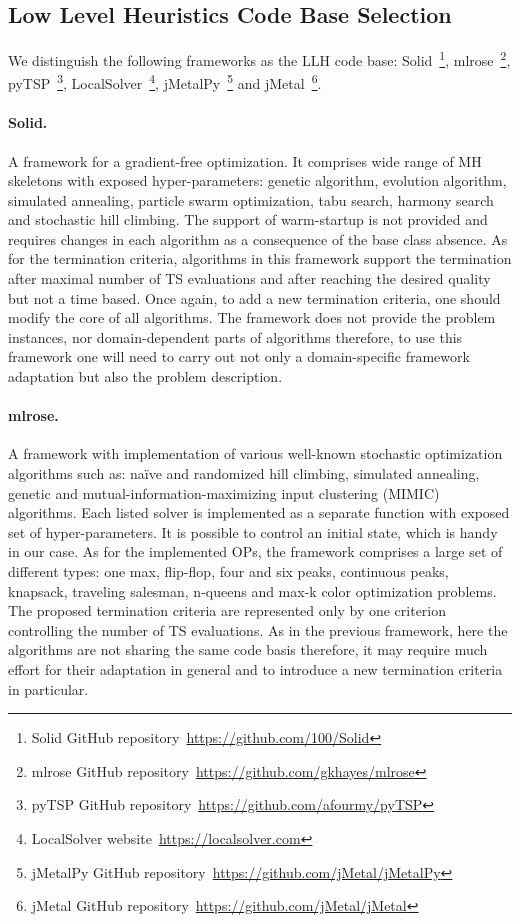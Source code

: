 \subsection{Low Level Heuristics Code Base Selection}\label{implementation:llh code basis selection}
We distinguish the following frameworks as the LLH code base: Solid~\footnote{Solid GitHub repository~\url{https://github.com/100/Solid}}, mlrose~\footnote{mlrose GitHub repository~\url{https://github.com/gkhayes/mlrose}}, pyTSP~\footnote{pyTSP GitHub repository~\url{https://github.com/afourmy/pyTSP}}, LocalSolver~\footnote{LocalSolver website~\url{https://localsolver.com}}, jMetalPy~\footnote{jMetalPy GitHub repository~\url{https://github.com/jMetal/jMetalPy}} and jMetal~\footnote{jMetal GitHub repository~\url{https://github.com/jMetal/jMetal}}.

\paragraph{Solid.} A framework for a gradient-free optimization. It comprises wide range of MH skeletons with exposed hyper-parameters: genetic algorithm, evolution algorithm, simulated annealing, particle swarm optimization, tabu search, harmony search and stochastic hill climbing. The support of warm-startup is not provided and requires changes in each algorithm as a consequence of the base class absence. As for the termination criteria, algorithms in this framework support the termination after maximal number of TS evaluations and after reaching the desired quality but not a time based. Once again, to add a new termination criteria, one should modify the core of all algorithms. The framework does not provide the problem instances, nor domain-dependent parts of algorithms therefore, to use this framework one will need to carry out not only a domain-specific framework adaptation but also the problem description.

\paragraph{mlrose.} A framework with implementation of various well-known stochastic optimization algorithms such as: na\"ive and randomized hill climbing, simulated annealing, genetic and mutual-information-maximizing input clustering (MIMIC) algorithms. Each listed solver is implemented as a separate function with exposed set of hyper-parameters. It is possible to control an initial state, which is handy in our case. As for the implemented OPs, the framework comprises a large set of different types: one max, flip-flop, four and six peaks, continuous peaks, knapsack, traveling salesman, n-queens and max-k color optimization problems. The proposed termination criteria are represented only by one criterion controlling the number of TS evaluations. As in the previous framework, here the algorithms are not sharing the same code basis therefore, it may require much effort for their adaptation in general and to introduce a new termination criteria in particular.

